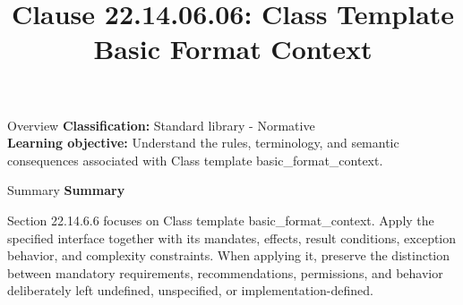 \documentclass[10pt,letterpaper]{article}
\title{Clause 22.14.06.06: Class Template Basic Format Context}
\author{}
\date{}
\begin{document}
\maketitle
\begin{CornellOverviewBox}{Overview}
\textbf{Classification:} Standard library - Normative\\[2pt]
\textbf{Learning objective:} Understand the rules, terminology, and semantic consequences associated with Class template basic\_format\_context.
\end{CornellOverviewBox}\begin{CornellSummaryBox}{Summary}
{\sffamily\bfseries\color{Accent} Summary}\par\vspace{3pt}Section 22.14.6.6 focuses on Class template basic\_format\_context. Apply the specified interface together with its mandates, effects, result conditions, exception behavior, and complexity constraints. When applying it, preserve the distinction between mandatory requirements, recommendations, permissions, and behavior deliberately left undefined, unspecified, or implementation-defined.
\end{CornellSummaryBox}
\end{document}
